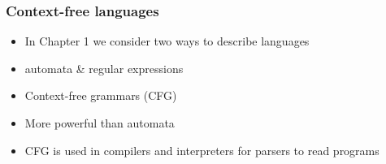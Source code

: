 




 \begin{frame}[allowframebreaks] \frametitle{Context-free languages}
  \begin{itemize}
\item In Chapter 1 we consider two ways to describe languages

\item [] automata \& regular expressions
\item Context-free grammars (CFG)

\item [] More powerful than automata
\item CFG is used in compilers and interpreters
for parsers to read programs

\end{itemize}\end{frame}


